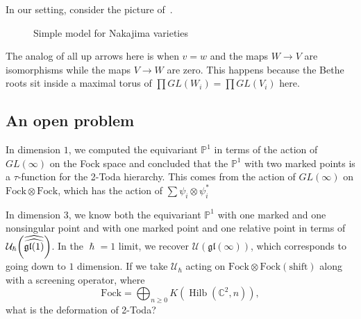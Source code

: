 \documentclass[leqno, openany]{memoir}
\theoremstyle{definition}
\theoremstyle{remark}
\theoremstyle{plain}
\theoremstyle{definition}
\theoremstyle{remark}
\newcommand{\C}{\mathbb{C}}
\renewcommand{\P}{\mathbb{P}}
\newcommand{\mc}[1]{\mathcal{#1}}
\newcommand{\mf}[1]{\mathfrak{#1}}
\newcommand{\mr}[1]{\mathrm{#1}}
\newcommand{\wh}[1]{\widehat{#1}}
\DeclareMathOperator{\Hilb}{Hilb}
\begin{document}
In our setting, consider the picture of~.
\begin{figure}[h]
\begin{center}
\end{center}
\caption{Simple model for Nakajima varieties}%
\label{fig:statmechnak}
\end{figure}
The analog of all up arrows here is when $v = w$ and the maps $W \to V$ are isomorphisms while the maps $V \to W$ are zero. This happens because the Bethe roots sit inside a maximal torus of $\prod GL(W_i) = \prod GL(V_i)$ here.

\subsection{An open problem}

In dimension $1$, we computed the equivariant $\P^1$ in terms of the action of $GL(\infty)$ on the Fock space and concluded that the $\P^1$ with two marked points is a $\tau$-function for the 2-Toda hierarchy. This comes from the action of $GL(\infty)$ on $\mr{Fock} \otimes \mr{Fock}$, which has the action of $\sum \psi_i \otimes \psi_i^*$

In dimension $3$, we know both the equivariant $\P^1$ with one marked and one nonsingular point and with one marked point and one relative point in terms of $\mc{U}_{\hslash} \qty(\wh{\wh{\mf{gl}(1)}})$. In the $\hslash=1$ limit, we recover $\mc{U}(\mf{gl}(\infty))$, which corresponds to going down to $1$ dimension. If we take $\mc{U}_{\hslash}$ acting on $\mr{Fock} \otimes \mr{Fock}(\mr{shift})$ along with a screening operator, where
\[ \mr{Fock} = \bigoplus_{n \geq 0} K(\Hilb(\C^2, n)), \]
what is the deformation of 2-Toda? 
\end{document}
